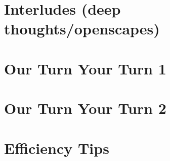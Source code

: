 \documentclass[]{book}
\begin{document}
\hypertarget{interludes-deep-thoughtsopenscapes-7}{%
\section{Interludes (deep thoughts/openscapes)}\label{interludes-deep-thoughtsopenscapes-7}}

\hypertarget{our-turn-your-turn-1-6}{%
\section{Our Turn Your Turn 1}\label{our-turn-your-turn-1-6}}

\hypertarget{our-turn-your-turn-2-7}{%
\section{Our Turn Your Turn 2}\label{our-turn-your-turn-2-7}}

\hypertarget{efficiency-tips-7}{%
\section{Efficiency Tips}\label{efficiency-tips-7}}


\end{document}
